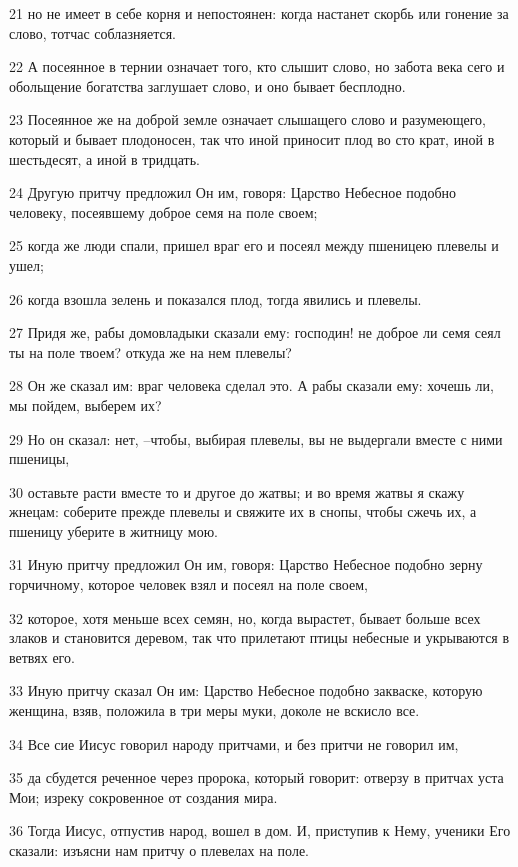 \par 21 но не имеет в себе корня и непостоянен: когда настанет скорбь или гонение за слово, тотчас соблазняется.
\par 22 А посеянное в тернии означает того, кто слышит слово, но забота века сего и обольщение богатства заглушает слово, и оно бывает бесплодно.
\par 23 Посеянное же на доброй земле означает слышащего слово и разумеющего, который и бывает плодоносен, так что иной приносит плод во сто крат, иной в шестьдесят, а иной в тридцать.
\par 24 Другую притчу предложил Он им, говоря: Царство Небесное подобно человеку, посеявшему доброе семя на поле своем;
\par 25 когда же люди спали, пришел враг его и посеял между пшеницею плевелы и ушел;
\par 26 когда взошла зелень и показался плод, тогда явились и плевелы.
\par 27 Придя же, рабы домовладыки сказали ему: господин! не доброе ли семя сеял ты на поле твоем? откуда же на нем плевелы?
\par 28 Он же сказал им: враг человека сделал это. А рабы сказали ему: хочешь ли, мы пойдем, выберем их?
\par 29 Но он сказал: нет, --чтобы, выбирая плевелы, вы не выдергали вместе с ними пшеницы,
\par 30 оставьте расти вместе то и другое до жатвы; и во время жатвы я скажу жнецам: соберите прежде плевелы и свяжите их в снопы, чтобы сжечь их, а пшеницу уберите в житницу мою.
\par 31 Иную притчу предложил Он им, говоря: Царство Небесное подобно зерну горчичному, которое человек взял и посеял на поле своем,
\par 32 которое, хотя меньше всех семян, но, когда вырастет, бывает больше всех злаков и становится деревом, так что прилетают птицы небесные и укрываются в ветвях его.
\par 33 Иную притчу сказал Он им: Царство Небесное подобно закваске, которую женщина, взяв, положила в три меры муки, доколе не вскисло все.
\par 34 Все сие Иисус говорил народу притчами, и без притчи не говорил им,
\par 35 да сбудется реченное через пророка, который говорит: отверзу в притчах уста Мои; изреку сокровенное от создания мира.
\par 36 Тогда Иисус, отпустив народ, вошел в дом. И, приступив к Нему, ученики Его сказали: изъясни нам притчу о плевелах на поле.

